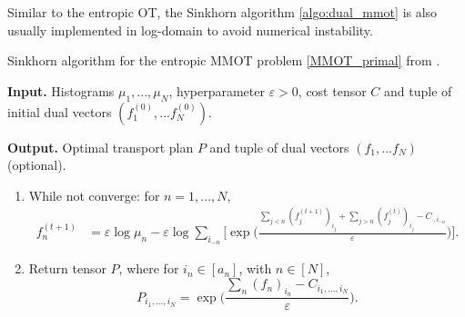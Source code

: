 Similar to the entropic OT, the Sinkhorn algorithm \ref{algo:dual_mmot} is also usually implemented in log-domain to avoid numerical instability.
\begin{algorithm}[t]
  \caption{Sinkhorn algorithm for the entropic MMOT problem \eqref{MMOT_primal} from \citep{Benamou14}.}
  \textbf{Input.} Histograms $\mu_1,...,\mu_N$, hyperparameter $\varepsilon > 0$, cost tensor $C$ and
  tuple of initial dual vectors $(f^{(0)}_1, ... f^{(0)}_N)$.

  \textbf{Output.} Optimal transport plan $P$ and tuple of dual vectors $(f_1, ... f_N)$ (optional).
  \begin{enumerate}
    \item While not converge: for $n = 1, ..., N$,
    \begin{equation}
      \begin{split}
        f^{(t+1)}_n &= \varepsilon \log \mu_n - \varepsilon \log \sum_{i_{-n}}
        \Big[ \exp\Big( \frac{\sum_{j < n} (f^{(t+1)}_j)_{i_j} + \sum_{j > n} (f^{(t)}_j)_{i_j} -
        C_{\cdot, i_{-n}}}{\varepsilon} \Big) \Big].
      \end{split}
    \end{equation}
    \item Return tensor $P$, where for $i_n \in [a_n]$, with $n \in [N]$,
    \begin{equation}
      P_{i_1,...,i_N} = \exp\Big( \frac{\sum_n (f_n)_{i_n} - C_{i_1,...,i_N}}{\varepsilon} \Big).
    \end{equation}
  \end{enumerate}
  \label{algo:dual_mmot}
\end{algorithm}

